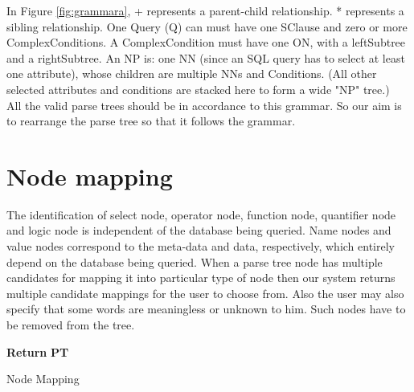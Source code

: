 \newpage
In Figure \ref{fig:grammara},
+ represents a parent-child relationship.
* represents a sibling relationship.
One Query (Q) can must have one SClause and zero or more ComplexConditions.
A ComplexCondition must have one ON, with a leftSubtree and a rightSubtree.
An NP is: one NN (since an SQL query has to select at least one attribute), whose children are multiple NNs and Conditions. (All other selected attributes and conditions are stacked here to form a wide "NP" tree.)\cite{eleven}\\
All the valid parse trees should be in accordance to this grammar. So our aim is to rearrange the parse tree so that it follows the grammar.

\section{Node mapping}\label{mapping}
The identification of select node, operator
node, function node, quantifier node and logic node is independent of the database being queried.
Name nodes and value nodes correspond to
the meta-data and data, respectively, which entirely depend
on the database being queried.
When a parse tree node has multiple candidates for mapping it into particular type of node then our system returns multiple candidate mappings for the user to choose from. Also the user may also specify that some words are meaningless or unknown to him. Such nodes have to be removed from the tree.



\begin{algorithm}[H]
\SetAlgoLined




\BlankLine



\textbf{Return} \textbf{PT}


 \caption{Node Mapping}
\end{algorithm}

